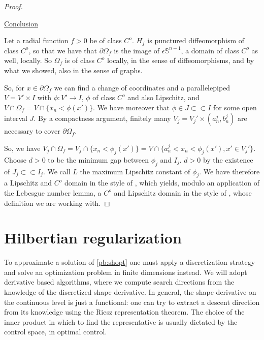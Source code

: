 \documentclass[english,a4paper,9pt,oneside]{scrbook}	%
\theoremstyle{break}
\newenvironment{mproof}[1][\proofname]{%
  \begin{proof}[#1]$ $\par\nobreak\ignorespaces
}{%
  \end{proof}
}
\renewcommand*{\proofname}{Proof}
\theoremstyle{remark}
\newcommand{\mS}{\mathbb{S}^{n-1}}
\newcommand{\cc}{\subset\subset}
\newcommand{\eps}{\epsilon}
\begin{document}
\begin{mproof}
\underline{Conclusion}

Let a radial function $f>0$ be of class $C^o$. $H_f$ is punctured diffeomorphism of class $C^o$, so that we have that $\partial \Omega_f$ is the image of $\eps\mS$, a domain of class $C^o$ as well, locally. So $\Omega_f $ is of class $C^o$ locally, in the sense of diffeomorphisms, and by what we showed, also in the sense of graphs.

So, for $x \in \partial \Omega_f$ we can find a change of coordinates and a parallelepiped $V = V'\times I$ with $\phi: V'\rightarrow I$, $\phi$ of class $C^o$ and also Lipschitz, and $V\cap 	\Omega_f = V\cap \{x_n<\phi(x')\}$. We have moreover that $\phi \in J \cc I$ for some open interval $J$. By a compactness argument, finitely many $V_j = V_j'\times (a_n^j, b_n^j) $ are necessary to cover $\partial \Omega_f$. 

So, we have $V_j \cap \Omega_f = V_j\cap \{x_n<\phi_j(x')\} = V\cap \{a_n^j<x_n<\phi_j(x'), x' \in V_j'\}$. Choose $d>0$ to be the minimum gap between $\phi_j$ and $I_j$. $d>0$ by the existence of $J_j \cc I_j$. We call $L$ the maximum Lipschitz constant of $\phi_j$. 
We have therefore a Lipschitz and $C^o$ domain in the style of \cite{burenkov}, which yields, modulo an application of the Lebesgue number lemma, a $C^o$ and Lipschitz domain in the style of \cite{grisvard}, whose definition we are working with.
\end{mproof}

\section{Hilbertian regularization}
\label{sec:hilbert}

To approximate a solution of \cref{pb:shopt} one must apply a discretization strategy and solve an optimization problem in finite dimensions instead. We will adopt derivative based algorithms, where we compute search directions from the knowledge of the discretized shape derivative. In general, the shape derivative on the continuous level is just a functional: one can try to extract a descent direction from its knowledge using the Riesz representation theorem. The choice of the inner product in which to find the representative is usually dictated by the control space, in optimal control. 

\end{document}

